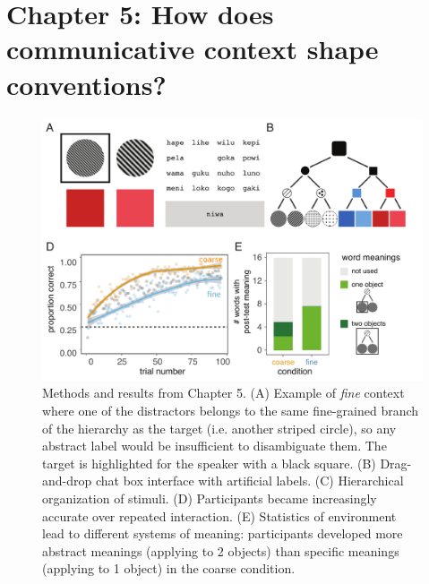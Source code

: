 \documentclass[11pt]{article}
\begin{document}
\section*{Chapter 5: How does communicative context shape conventions?}

\begin{figure}[t!]
\centering
\includegraphics[scale=0.8]{chapter5}
\caption{\small Methods and results from Chapter 5. (A) Example of \emph{fine} context where one of the distractors belongs to the same fine-grained branch of the hierarchy as the target (i.e. another striped circle), so any abstract label would be insufficient to disambiguate them. The target is highlighted for the speaker with a black square. (B) Drag-and-drop chat box interface with artificial labels. (C) Hierarchical organization of stimuli. (D) Participants became increasingly accurate over repeated interaction. (E) Statistics of environment lead to different systems of meaning: participants developed more abstract meanings (applying to 2 objects) than specific meanings (applying to 1 object) in the coarse condition.}
\label{fig:chapter5}
\end{figure}
\end{document}
